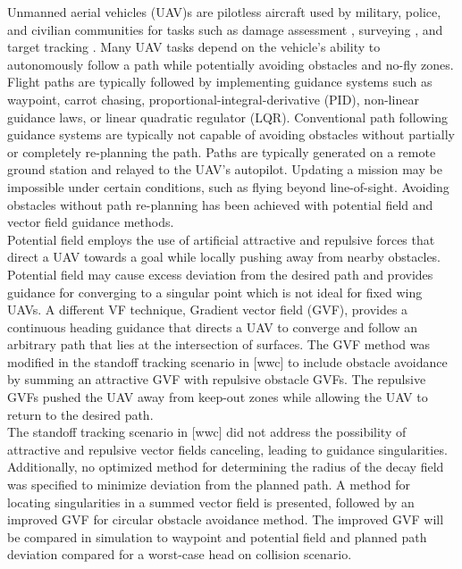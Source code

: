 \documentclass[conf]{new-aiaa}
\begin{document}
Unmanned aerial vehicles (UAV)s are pilotless aircraft used by military, police, and civilian communities for tasks such as damage assessment \cite{fernandez_galarreta_uav-based_2015}, surveying \cite{remondino_uav_2012}, and target tracking \cite{frew_cooperative_2007,oh_coordinated_2013,hyondong_oh_coordinated_2015,oliveira_moving_2016}. Many UAV tasks depend on the vehicle's ability to autonomously follow a path while potentially avoiding obstacles and no-fly zones. Flight paths are typically followed by implementing guidance systems such as waypoint, carrot chasing, proportional-integral-derivative (PID), non-linear guidance laws, or linear quadratic regulator (LQR). Conventional path following guidance systems are typically not capable of avoiding obstacles without partially or completely re-planning the path. Paths are typically generated on a remote ground station and relayed to the UAV’s autopilot. Updating a mission may be impossible under certain conditions, such as flying beyond line-of-sight. Avoiding obstacles without path re-planning has been achieved with potential field \cite{borenstein_real-time_1990,borenstein_vector_1991} and vector field \cite{frew_cooperative_2007,griffiths_vector_2006,goncalves_artificial_2009,goncalves_circulation_2010,goncalves_vector_2010} guidance methods.\\

 Potential field employs the use of artificial attractive and repulsive forces that direct a UAV towards a goal while locally pushing away from nearby obstacles. Potential field may cause excess deviation from the desired path and provides guidance for converging to a singular point which is not ideal for fixed wing UAVs. A different VF technique, Gradient vector field (GVF), provides a continuous heading guidance that directs a UAV to converge and follow an arbitrary path that lies at the intersection of surfaces. The GVF method was modified in the standoff tracking scenario in [wwc] to include obstacle avoidance by summing an attractive GVF with repulsive obstacle GVFs. The repulsive GVFs pushed the UAV away from keep-out zones while allowing the UAV to return to the desired path. \\

The standoff tracking scenario in [wwc] did not address the possibility of attractive and repulsive vector fields canceling, leading to guidance singularities. Additionally, no optimized method for determining the radius of the decay field was specified to minimize deviation from the planned path. A method for locating singularities in a summed vector field is presented, followed by an improved GVF for circular obstacle avoidance method. The improved GVF will be compared in simulation to waypoint and potential field and planned path deviation compared for a worst-case head on collision scenario.
\end{document}
